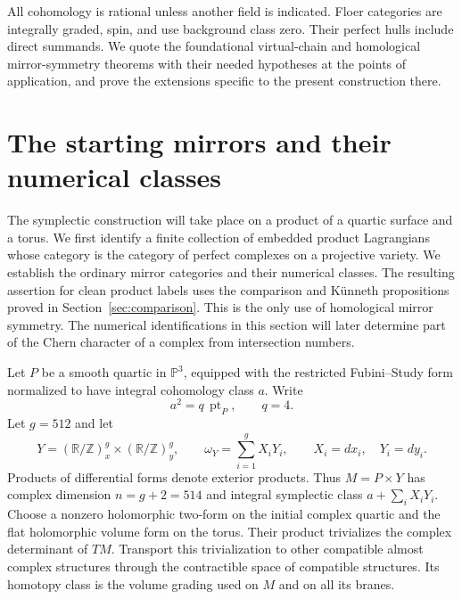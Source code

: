 \documentclass[11pt]{article}
\numberwithin{equation}{section}
\theoremstyle{definition}
\theoremstyle{remark}
\begin{document}
All cohomology is rational unless another field is indicated.
Floer categories are integrally graded, spin, and use background
class zero.  Their perfect hulls include direct summands.  We
quote the foundational virtual-chain and homological
mirror-symmetry theorems with their needed hypotheses at the
points of application, and prove the extensions specific to the
present construction there.


\section{The starting mirrors and their numerical classes}\label{sec:mirror}

The symplectic construction will take place on a product of a quartic surface
and a torus.  We first identify a finite collection of embedded product
Lagrangians whose category is the category of perfect complexes on a projective
variety.  We establish the ordinary mirror categories and their
numerical classes.  The resulting assertion for clean product labels
uses the comparison and K\"unneth propositions proved in
Section~\ref{sec:comparison}.  This is the only use of homological mirror symmetry.  The numerical
identifications in this section will later determine part of the Chern character
of a complex from intersection numbers.

Let $P$ be a smooth quartic in $\mathbb P^3$, equipped with the restricted
Fubini--Study form normalized to have integral cohomology class $a$.  Write
\begin{equation}\label{eq:quartic-normalization}
 a^2=q\,\operatorname{pt}_P,\qquad q=4.
\end{equation}
Let $g=512$ and let
\[
 Y=(\mathbb R/\mathbb Z)^g_x\times(\mathbb R/\mathbb Z)^g_y,\qquad
 \omega_Y=\sum_{i=1}^g X_iY_i,
 \qquad X_i=dx_i,\quad Y_i=dy_i.
\]
Products of differential forms denote exterior products.  Thus
$M=P\times Y$ has complex dimension $n=g+2=514$ and integral symplectic
class $a+\sum_iX_iY_i$.
Choose a nonzero holomorphic two-form on the initial complex quartic
and the flat holomorphic volume form on the torus.  Their product
trivializes the complex determinant of $TM$.  Transport this
trivialization to other compatible almost complex structures through
the contractible space of compatible structures.  Its homotopy
class is the volume grading used on $M$ and on all its branes.
\end{document}
